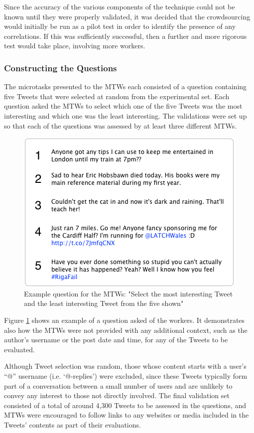 Since the accuracy of the various components of the technique could not be known until they were properly validated, it was decided that the crowdsourcing would initially be run as a pilot test in order to identify the presence of any correlations. If this was sufficiently successful, then a further and more rigorous test would take place, involving more workers.


\subsubsection{Constructing the Questions}
The microtasks presented to the MTWs each consisted of a question containing five Tweets that were selected at random from the experimental set. Each question asked the MTWs to select which one of the five Tweets was the most interesting and which one was the least interesting. The validations were set up so that each of the questions was assessed by at least three different MTWs.

\begin{figure}[h]
\centering
\includegraphics[scale=0.8]{4.Chapter2/Media/mtk_question.png} 
\caption{Example question for the MTWs: "Select the most interesting Tweet and the least interesting Tweet from the five shown"}
\label{fig:mtk_question}
\end{figure}

Figure \ref{fig:mtk_question} shows an example of a question asked of the workers. It demonstrates also how the MTWs were not provided with any additional context, such as the author's username or the post date and time, for any of the Tweets to be evaluated.

Although Tweet selection was random, those whose content starts with a user's ``@'' username (i.e. `@-replies') were excluded, since these Tweets typically form part of a conversation between a small number of users and are unlikely to convey any interest to those not directly involved. The final validation set consisted of a total of around 4,300 Tweets to be assessed in the questions, and MTWs were encouraged to follow links to any websites or media included in the Tweets' contents as part of their evaluations.


